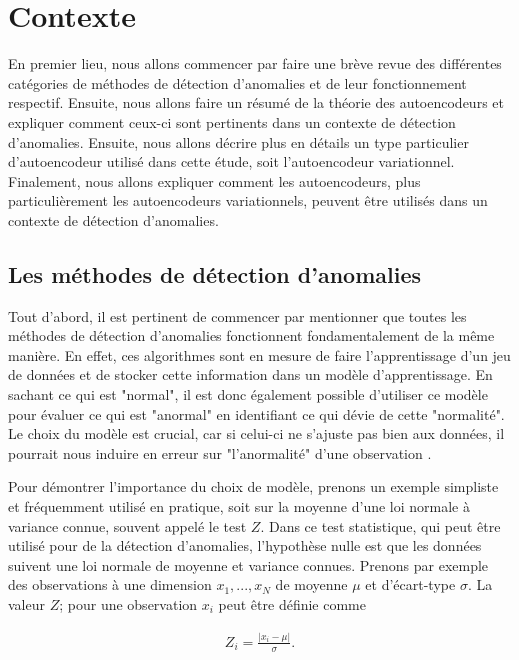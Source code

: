 \chapter{Contexte}     %
\label{chap:background}                   %

En premier lieu, nous allons commencer par faire une brève revue des différentes catégories  de méthodes de détection d'anomalies et de leur fonctionnement respectif. Ensuite, nous allons faire un résumé de la théorie des autoencodeurs et expliquer comment ceux-ci sont pertinents dans un contexte de détection d'anomalies. Ensuite, nous allons décrire plus en détails un type particulier d'autoencodeur utilisé dans cette étude, soit l'autoencodeur variationnel. Finalement, nous allons expliquer comment les autoencodeurs, plus particulièrement les autoencodeurs variationnels, peuvent être utilisés dans un contexte de détection d'anomalies.

\section{Les méthodes de détection d'anomalies}

Tout d'abord, il est pertinent de commencer par mentionner que toutes les méthodes de détection d'anomalies fonctionnent fondamentalement de la même manière. En effet, ces algorithmes sont en mesure de faire l'apprentissage d'un jeu de données et de stocker cette information dans un modèle d'apprentissage. En sachant ce qui est "normal", il est donc également possible d'utiliser ce modèle pour évaluer ce qui est "anormal" en identifiant ce qui dévie de cette "normalité". Le choix du modèle est crucial, car si celui-ci ne s'ajuste pas bien aux données, il pourrait nous induire en erreur sur "l'anormalité" d'une observation \citep{10.5555/3086742}. 

Pour démontrer l'importance du choix de modèle, prenons un exemple simpliste et fréquemment utilisé en pratique, soit sur la moyenne d'une loi normale à variance connue, souvent appelé le test $Z$. Dans ce test statistique, qui peut être utilisé pour de la détection d'anomalies, l'hypothèse nulle est que les données suivent une loi normale de moyenne et variance connues. Prenons par exemple des observations à une dimension $x_1, ..., x_N$ de moyenne $\mu$ et d'écart-type $\sigma$. La valeur $Z$; pour une observation $x_i$ peut être définie comme

\begin{gather}
Z_i = \frac{|x_i-\mu|}{\sigma}.
\end{gather}

